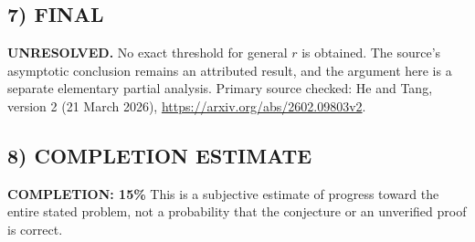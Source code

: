 \subsection*{7) FINAL}
\textbf{UNRESOLVED.} No exact threshold for general $r$ is obtained. The source's asymptotic conclusion remains an attributed result, and the argument here is a separate elementary partial analysis.
\noindent Primary source checked: He and Tang, version 2 (21 March 2026), \url{https://arxiv.org/abs/2602.09803v2}.

\subsection*{8) COMPLETION ESTIMATE}
\textbf{COMPLETION: 15\%}
This is a subjective estimate of progress toward the entire stated problem, not a probability that the conjecture or an unverified proof is correct.
